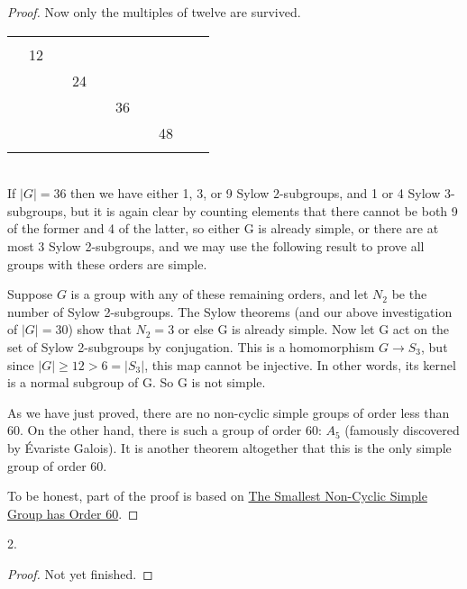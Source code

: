 \begin{proof}
Now only the multiples of twelve are survived.\\

\begin{tabular}{llllllllll}
    \toprule
      &   &   &   &   &   &   &   &   &  \\ 
     & 12 &  &  &  &  &  &  &  &  \\
     &  &  & 24 &  &  &  &  &  &  \\
     &  &  &  &  & 36 &  &  &  &  \\
     &  &  &  &  &  &  & 48 &  &  \\
     &  &  &  &  &  &  &  &  &    \\ \bottomrule
\end{tabular}\\

If $|G| = 36$ then we have either 1, 3, or 9 Sylow $2$-subgroups, and 1 or 4 Sylow $3$-subgroups, but it is again clear by counting elements that there cannot be both 9 of the former and 4 of the latter, so either G is already simple, or there are at most 3 Sylow 2-subgroups, and we may use the following result to prove all groups with these orders are simple.

Suppose $G$ is a group with any of these remaining orders, and let $N_2$ be the number of Sylow 2-subgroups. The Sylow theorems (and our above investigation of $|G| = 30$) show that $N_2 = 3$ or else G is already simple. Now let G act on the set of Sylow 2-subgroups by conjugation. This is a homomorphism $G \to S_3$, but since $|G| \geq 12 > 6 = |S_3|$, this map cannot be injective. In other words, its kernel is a normal subgroup of G. So G is not simple.

As we have just proved, there are no non-cyclic simple groups of order less than $60$. On the other hand, there is such a group of order 60: $A_5$ (famously discovered by Évariste Galois). It is another theorem altogether that this is the only simple group of order 60.

To be honest, part of the proof is based on \href{https://jeremykun.com/2011/10/08/the-smallest-non-cyclic-simple-group-has-order-60/}{The Smallest Non-Cyclic Simple Group has Order 60}.

\end{proof}


\begin{exercise}
    2.
\end{exercise}

\begin{proof}   
    Not yet finished.
\end{proof}
